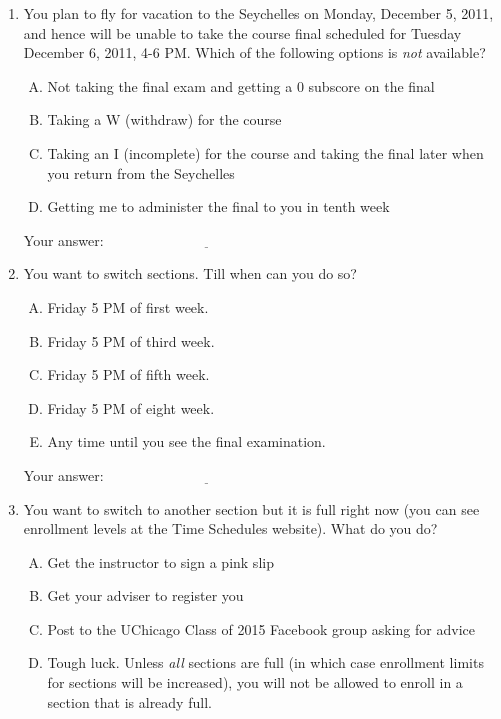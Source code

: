\documentclass[10pt]{amsart}
\begin{document}
\begin{enumerate}
\item You plan to fly for vacation to the Seychelles on Monday,
  December 5, 2011, and hence will be unable to take the course final
  scheduled for Tuesday December 6, 2011, 4-6 PM. Which of the
  following options is {\em not} available?

  \begin{enumerate}[(A)]
  \item Not taking the final exam and getting a $0$ subscore on the final
  \item Taking a W (withdraw) for the course
  \item Taking an I (incomplete) for the course and taking the final
    later when you return from the Seychelles
  \item Getting me to administer the final to you in tenth week
  \end{enumerate}

  \vspace{0.1in}
  Your answer: $\underline{\qquad\qquad\qquad\qquad\qquad\qquad\qquad}$
  \vspace{0.1in}

\item You want to switch sections. Till when can you do so?

  \begin{enumerate}[(A)]
  \item Friday 5 PM of first week.
  \item Friday 5 PM of third week.
  \item Friday 5 PM of fifth week.
  \item Friday 5 PM of eight week.
  \item Any time until you see the final examination.
  \end{enumerate}

  \vspace{0.1in}
  Your answer: $\underline{\qquad\qquad\qquad\qquad\qquad\qquad\qquad}$
  \vspace{0.1in}

\item You want to switch to another section but it is full right now
  (you can see enrollment levels at the Time Schedules website). What do
  you do?

  \begin{enumerate}[(A)]
  \item Get the instructor to sign a pink slip
  \item Get your adviser to register you
  \item Post to the UChicago Class of 2015 Facebook group asking for
    advice
  \item Tough luck. Unless {\em all} sections are full (in which case
    enrollment limits for sections will be increased), you will not be
    allowed to enroll in a section that is already full.
  \end{enumerate}


\end{enumerate}
\end{document}
